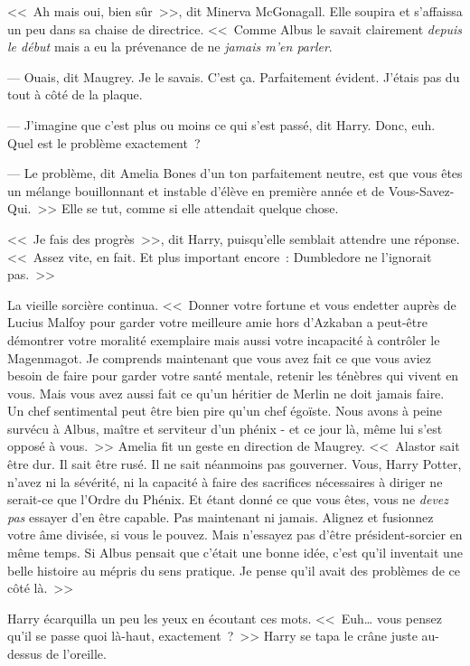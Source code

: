 <<~Ah mais oui, bien sûr~>>, dit Minerva McGonagall. Elle soupira et s'affaissa un peu dans sa chaise de directrice. <<~Comme Albus le savait clairement \emph{depuis le début} mais a eu la prévenance de ne \emph{jamais m'en parler}.

--- Ouais, dit Maugrey. Je le savais. C'est ça. Parfaitement évident. J'étais pas du tout à côté de la plaque.

--- J'imagine que c'est plus ou moins ce qui s'est passé, dit Harry. Donc, euh. Quel est le problème exactement~?

--- Le problème, dit Amelia Bones d'un ton parfaitement neutre, est que vous êtes un mélange bouillonnant et instable d'élève en première année et de Vous-Savez-Qui.~>> Elle se tut, comme si elle attendait quelque chose.

<<~Je fais des progrès~>>, dit Harry, puisqu'elle semblait attendre une réponse. <<~Assez vite, en fait. Et plus important encore~: Dumbledore ne l'ignorait pas.~>>

La vieille sorcière continua. <<~Donner votre fortune et vous endetter auprès de Lucius Malfoy pour garder votre meilleure amie hors d'Azkaban a peut-être démontrer votre moralité exemplaire mais aussi votre incapacité à contrôler le Magenmagot. Je comprends maintenant que vous avez fait ce que vous aviez besoin de faire pour garder votre santé mentale, retenir les ténèbres qui vivent en vous. Mais vous avez aussi fait ce qu'un héritier de Merlin ne doit jamais faire. Un chef sentimental peut être bien pire qu'un chef égoïste. Nous avons à peine survécu à Albus, maître et serviteur d'un phénix - et ce jour là, même lui s'est opposé à vous.~>> Amelia fit un geste en direction de Maugrey. <<~Alastor sait être dur. Il sait être rusé. Il ne sait néanmoins pas gouverner. Vous, Harry Potter, n'avez ni la sévérité, ni la capacité à faire des sacrifices nécessaires à diriger ne serait-ce que l'Ordre du Phénix. Et étant donné ce que vous êtes, vous ne \emph{devez pas} essayer d'en être capable. Pas maintenant ni jamais. Alignez et fusionnez votre âme divisée, si vous le pouvez. Mais n'essayez pas d'être président-sorcier en même temps. Si Albus pensait que c'était une bonne idée, c'est qu'il inventait une belle histoire au mépris du sens pratique. Je pense qu'il avait des problèmes de ce côté là.~>>

Harry écarquilla un peu les yeux en écoutant ces mots. <<~Euh… vous pensez qu'il se passe quoi là-haut, exactement~?~>> Harry se tapa le crâne juste au-dessus de l'oreille.

